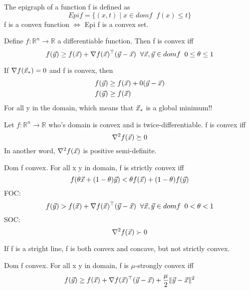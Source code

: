 \begin{definition}[Epigraph]
	The epigraph of a function f is defined as
	\[
Epi f = \{(x, t)\;|\;x\in dom f \;\; f(x) \le t\}
	\]
	f is a convex function $\iff$ Epi f is a convex set.
\end{definition}

\begin{theorem}
	Define $f:\mathbb{R}^n\rightarrow\mathbb{R}$ a differentiable function. Then f is convex iff
	\[
f(\vec{y})\ge f(\vec{x})+\nabla f(\vec{x})^\top(\vec{y}-\vec{x}) \;\; \forall \vec{x}, \vec{y}\in dom f\;\;0\le\theta\le1
	\]
\end{theorem}

\begin{remark}
	If $\nabla f(\vec{x}_*) = 0$ and f is convex, then
	\begin{align*}
		f(\vec{y}) &\ge f(\vec{x})+0(\vec{y}-\vec{x})\\
		f(\vec{y}) &\ge f(\vec{x})
	\end{align*}
	For all y in the domain, which means that $\vec{x}_*$ is a global minimum!!
\end{remark}

\begin{theorem}
	Let $f:\mathbb{R}^n\rightarrow\mathbb{R}$ who's domain is convex and is twice-differentiable. f is convex iff
	\[
	\nabla^2f(\vec{x}) \succeq 0
	\]
	In another word, $\nabla^2f(\vec{x})$ is positive semi-definite.
\end{theorem}

\begin{definition}
	Dom f convex. For all x y in domain, f is strictly convex iff
	\[
f(\theta\vec{x}+(1-\theta)\vec{y}) < \theta f(\vec{x})+(1-\theta)f(\vec{y})
	\]
	FOC:
	\[
f(\vec{y}) > f(\vec{x})+\nabla f(\vec{x})^\top(\vec{y}-\vec{x}) \;\; \forall \vec{x}, \vec{y}\in dom f\;\; 0<\theta<1
	\]
	SOC:
	\[
\nabla^2f(\vec{x}) \succ 0
	\]
\end{definition}

\begin{remark}
	If f is a stright line, f is both convex and concave, but not strictly convex.
\end{remark}

\begin{definition}
	Dom f convex. For all x y in domain, f is $\mu$-strongly convex iff
	\[
f(\vec{y})\ge f(\vec{x})+\nabla f(\vec{x})^\top(\vec{y}-\vec{x}) + \frac{\mu}{2}\|\vec{y}-\vec{x}\|^2
	\]
\end{definition}

